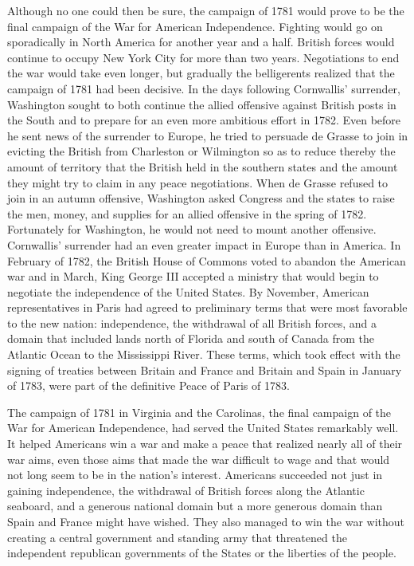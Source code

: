 Although no one could then be sure, the campaign of 1781 would prove to be the final
campaign of the War for American Independence. Fighting would go on sporadically in
North America for another year and a half. British forces would continue to occupy New
York City for more than two years. Negotiations to end the war would take even longer, but
gradually the belligerents realized that the campaign of 1781 had been decisive. In the days
following Cornwallis' surrender, Washington sought to both continue the allied offensive
against British posts in the South and to prepare for an even more ambitious effort in 1782.
Even before he sent news of the surrender to Europe, he tried to persuade de Grasse to join
in evicting the British from Charleston or Wilmington so as to reduce thereby the amount
of territory that the British held in the southern states and the amount they might try to
claim in any peace negotiations. When de Grasse refused to join in an autumn offensive,
Washington asked Congress and the states to raise the men, money, and supplies for an
allied offensive in the spring of 1782. Fortunately for Washington, he would not need
to mount another offensive. Cornwallis' surrender had an even greater impact in Europe
than in America. In February of 1782, the British House of Commons voted to abandon
the American war and in March, King George III accepted a ministry that would begin to
negotiate the independence of the United States. By November, American representatives
in Paris had agreed to preliminary terms that were most favorable to the new nation:
independence, the withdrawal of all British forces, and a domain that included lands north
of Florida and south of Canada from the Atlantic Ocean to the Mississippi River. These
terms, which took effect with the signing of treaties between Britain and France and Britain
and Spain in January of 1783, were part of the definitive Peace of Paris of 1783.

The campaign of 1781 in Virginia and the Carolinas, the final campaign of the War
for American Independence, had served the United States remarkably well. It helped
Americans win a war and make a peace that realized nearly all of their war aims, even those
aims that made the war difficult to wage and that would not long seem to be in the nation's
interest. Americans succeeded not just in gaining independence, the withdrawal of British
forces along the Atlantic seaboard, and a generous national domain but a more generous
domain than Spain and France might have wished. They also managed to win the war
without creating a central government and standing army that threatened the independent
republican governments of the States or the liberties of the people.

